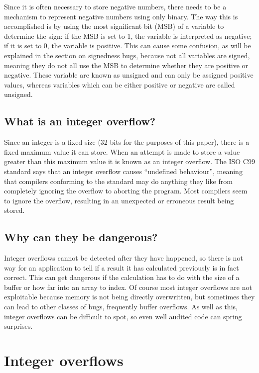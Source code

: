 \documentclass{iacrtrans}
\begin{document}
Since it is often necessary to store negative numbers, there needs to be a
mechanism to represent negative numbers using only binary.  The way this is
accomplished is by using the most significant bit (MSB) of a variable to
determine the sign: if the MSB is set to 1, the variable is interpreted as
negative; if it is set to 0, the variable is positive.  This can cause some
confusion, as will be explained in the section on signedness bugs, because
not all variables are signed, meaning they do not all use the MSB to
determine whether they are positive or negative.  These variable are known
as unsigned and can only be assigned positive values, whereas variables
which can be either positive or negative are called unsigned.


\subsection{What is an integer overflow?}

Since an integer is a fixed size (32 bits for the purposes of this paper),
there is a fixed maximum value it can store.  When an attempt is made to
store a value greater than this maximum value it is known as an integer
overflow.  The ISO C99 standard says that an integer overflow causes
``undefined behaviour'', meaning that compilers conforming to the standard
may do anything they like from completely ignoring the overflow to aborting
the program.  Most compilers seem to ignore the overflow, resulting in an
unexpected or erroneous result being stored.


\subsection{Why can they be dangerous?}

Integer overflows cannot be detected after they have happened, so there is
not way for an application to tell if a result it has calculated previously
is in fact correct.  This can get dangerous if the calculation has to do
with the size of a buffer or how far into an array to index.  Of course
most integer overflows are not exploitable because memory is not being
directly overwritten, but sometimes they can lead to other classes of bugs,
frequently buffer overflows.  As well as this, integer overflows can be
difficult to spot, so even well audited code can spring surprises.



\section{Integer overflows}
\end{document}
